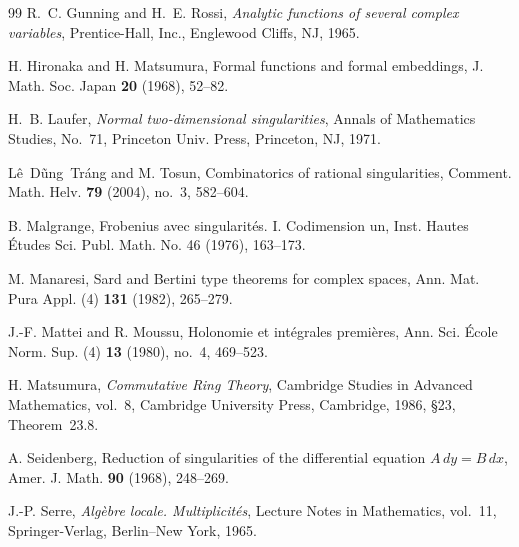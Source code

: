 \documentclass[11pt,twoside]{amsart}
\theoremstyle{definition}
\begin{document}
\begin{thebibliography}{99}
R.~C. Gunning and H.~E. Rossi, {\it Analytic functions of several complex variables}, Prentice-Hall, Inc., Englewood Cliffs, NJ, 1965.

H. Hironaka and H. Matsumura, Formal functions and formal embeddings,
J. Math. Soc. Japan \textbf{20} (1968), 52--82.

H.~B. Laufer, {\it Normal two-dimensional singularities}, Annals of
Mathematics Studies, No.~71, Princeton Univ. Press, Princeton, NJ, 1971.

L\^e~D\~ung~Tr\'ang and M. Tosun, Combinatorics of rational singularities, Comment. Math. Helv. {\bf 79} (2004), no.~3, 582--604.

B. Malgrange, Frobenius avec singularit\'es. I. Codimension un, Inst. Hautes \'Etudes Sci. Publ. Math. No. 46 (1976), 163--173.


M. Manaresi, Sard and Bertini type theorems for complex spaces, Ann. Mat. Pura Appl. (4) {\bf 131} (1982), 265--279.


J.-F. Mattei and R. Moussu, Holonomie et int\'egrales premi\`eres, Ann. Sci. \'Ecole Norm. Sup. (4) {\bf 13} (1980), no.~4, 469--523.



H. Matsumura, \emph{Commutative Ring Theory}, Cambridge Studies in Advanced
Mathematics, vol.~8, Cambridge University Press, Cambridge, 1986,
\S23, Theorem~23.8.

A. Seidenberg, Reduction of singularities of the differential equation $A\,dy=B\,dx$, Amer. J. Math. {\bf 90} (1968), 248--269.






J.-P. Serre, \emph{Alg\`ebre locale. Multiplicit\'es}, Lecture Notes in
Mathematics, vol.~11, Springer-Verlag, Berlin--New York, 1965.


\end{thebibliography}
\end{document}
